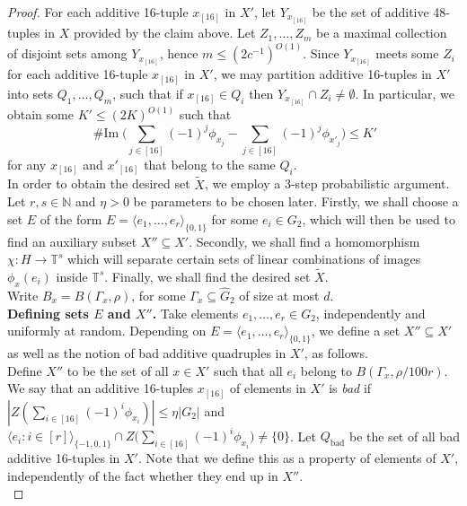 \documentclass[a4paper,11pt]{article}
\numberwithin{theorem}{section}
\theoremstyle{definition}
\newcommand{\on}[1]{
	\operatorname{#1}
}
\newcommand\range{\on{\# Im}}
\begin{document}
\begin{proof}
    For each additive 16-tuple $x_{[16]}$ in $X'$, let $Y_{x_{[16]}}$ be the set of additive 48-tuples in $X$ provided by the claim above. Let $Z_1, \dots, Z_m$ be a maximal collection of disjoint sets among $Y_{x_{[16]}}$, hence $m \leq (2c^{-1})^{O(1)}$. Since $Y_{x_{[16]}}$ meets some $Z_i$ for each additive 16-tuple $x_{[16]}$ in $X'$, we may partition additive 16-tuples in $X'$  into sets $Q_1, \dots, Q_m$, such that if $x_{[16]} \in Q_i$ then $Y_{x_{[16]}} \cap Z_i \not= \emptyset$. In particular, we obtain some $K' \leq (2K)^{O(1)}$ such that 
    \[\range\Big(\sum_{j \in [16]} (-1)^j \phi_{x_j} - \sum_{j \in [16]} (-1)^j \phi_{x'_j}\Big) \leq K'\]
    for any $x_{[16]}$ and $x'_{[16]}$ that belong to the same $Q_i$.\\

    
    

    \indent In order to obtain the desired set $\tilde{X}$, we employ a 3-step probabilistic argument. Let $r, s \in \mathbb{N}$ and $\eta > 0$ be parameters to be chosen later. Firstly, we shall choose a set $E$ of the form $E = \langle e_{1}, \dots, e_{r}\rangle_{\{0,1\}}$ for some $e_i \in G_2$, which will then be used to find an auxiliary subset $X'' \subseteq X'$. Secondly, we shall find a homomorphism $\chi: H \to \mathbb{T}^s$ which will separate certain sets of linear combinations of images $\phi_x(e_i)$ inside $\mathbb{T}^s$. Finally, we shall find the desired set $\tilde{X}$.\\
    \indent Write $B_x = B(\Gamma_x, \rho)$, for some $\Gamma_x \subseteq \hat{G}_2$ of size at most $d$.\\

    


    \noindent\textbf{Defining sets $E$ and $X''$.} Take elements $e_1, \dots, e_r \in G_2$, independently and uniformly at random. Depending on $E  = \langle e_{1}, \dots, e_{r}\rangle_{\{0,1\}}$, we define a set $X'' \subseteq X'$ as well as the notion of bad additive quadruples in $X'$, as follows.\\
    \indent Define $X''$ to be the set of all $x \in X'$ such that all $e_{i}$ belong to $B(\Gamma_x, \rho/100r)$.\\
    \indent We say that an additive 16-tuples $x_{[16]}$ of elements in $X'$ is \textit{bad} if $|Z(\sum_{i \in [16]} (-1)^i\phi_{x_i})| \leq \eta |G_2|$ and $\langle e_{i} : i \in [r]\rangle_{\{-1,0,1\}} \cap Z\Big(\sum_{i \in [16]} (-1)^i\phi_{x_i}\Big) \not=\{0\}$. Let $Q_{\on{bad}}$ be the set of all bad additive 16-tuples in $X'$. Note that we define this as a property of elements of $X'$, independently of the fact whether they end up in $X''$.\\
    

\end{proof}
\end{document}

